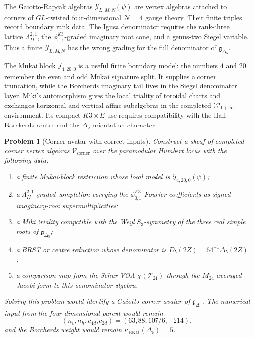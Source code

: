 \documentclass[11pt]{article}
\newtheorem{problem}[theorem]{Problem}
\providecommand{\cT}{\mathcal{T}}
\providecommand{\cV}{\mathcal{V}}
\providecommand{\cW}{\mathcal{W}}
\providecommand{\cY}{\mathcal{Y}}
\providecommand{\fg}{\mathfrak{g}}
\providecommand{\kBKM}{\kappa_{\mathrm{BKM}}}
\begin{document}
The Gaiotto-Rapcak algebras \(\cY_{L,M,N}(\psi)\) are vertex algebras
attached to corners of \(GL\)-twisted four-dimensional
\(\mathcal{N}{=}4\) gauge theory. Their finite triples record boundary
rank data. The Igusa denominator requires the rank-three lattice
\(\Lambda^{2,1}_{II}\), the \(\phi_{0,1}^{K3}\)-graded imaginary
root cone, and a genus-two Siegel variable. Thus a finite
\(\cY_{L,M,N}\) has the wrong grading for the full denominator
of \(\fg_{\Delta_5}\).

The Mukai block \(\cY_{4,20,0}\) is a useful finite boundary model:
the numbers \(4\) and \(20\) remember the even and odd Mukai signature
split. It supplies a corner truncation, while the Borcherds imaginary
tail lives in the Siegel denominator layer. Miki's automorphism gives
the local triality of toroidal charts and exchanges horizontal and
vertical affine subalgebras in the completed \(\cW_{1+\infty}\)
environment. Its compact \(K3\times E\) use requires compatibility with
the Hall-Borcherds centre and the \(\Delta_5\) orientation character.

\begin{problem}[Corner avatar with correct inputs]
\label{prob:corner-avatar-correct-inputs}
Construct a sheaf of completed corner vertex algebras
\(\cV_{\mathrm{corner}}\) over the paramodular Humbert locus with the
following data:
\begin{enumerate}[leftmargin=2em]
  \item a finite Mukai-block restriction whose local model is
  \(\cY_{4,20,0}(\psi)\);
  \item a \(\Lambda^{2,1}_{II}\)-graded completion carrying the
  \(\phi_{0,1}^{K3}\)-Fourier coefficients as signed imaginary-root
  supermultiplicities;
  \item a Miki triality compatible with the Weyl \(S_3\)-symmetry of
  the three real simple roots of \(\fg_{\Delta_5}\);
  \item a BRST or centre reduction whose denominator is
  \(D_5(2Z)=64^{-1}\Delta_5(2Z)\);
  \item a comparison map from the Schur VOA \(\chi(\cT_{24})\) through
  the \(M_{24}\)-averaged Jacobi form to this denominator algebra.
\end{enumerate}
Solving this problem would identify a Gaiotto-corner avatar of
\(\fg_{\Delta_5}\). The numerical input from the four-dimensional parent
would remain
\[
  (n_v,n_h,c_{4d},c_{2d})=(63,88,107/6,-214),
\]
and the Borcherds weight would remain \(\kBKM(\Delta_5)=5\).
\end{problem}
\end{document}
